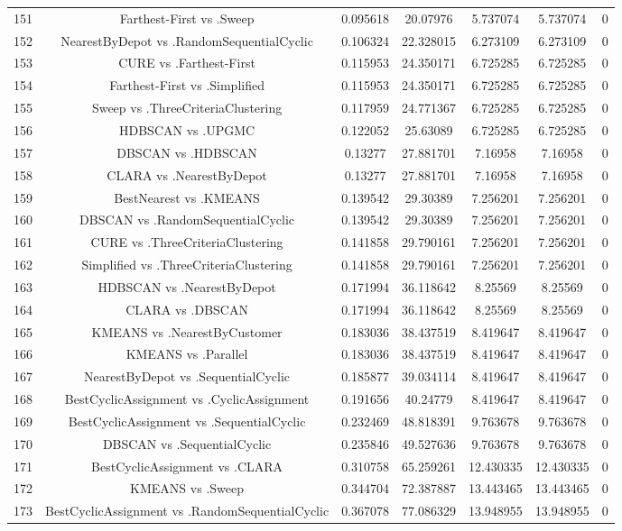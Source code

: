 \documentclass[a4paper,10pt]{article}
\begin{document}
\begin{landscape}
\begin{table}[!htp]
\begin{tabular}{ccccccc}
151&Farthest-First vs .Sweep&0.095618&20.07976&5.737074&5.737074&0\\
152&NearestByDepot vs .RandomSequentialCyclic&0.106324&22.328015&6.273109&6.273109&0\\
153&CURE vs .Farthest-First&0.115953&24.350171&6.725285&6.725285&0\\
154&Farthest-First vs .Simplified&0.115953&24.350171&6.725285&6.725285&0\\
155&Sweep vs .ThreeCriteriaClustering&0.117959&24.771367&6.725285&6.725285&0\\
156&HDBSCAN vs .UPGMC&0.122052&25.63089&6.725285&6.725285&0\\
157&DBSCAN vs .HDBSCAN&0.13277&27.881701&7.16958&7.16958&0\\
158&CLARA vs .NearestByDepot&0.13277&27.881701&7.16958&7.16958&0\\
159&BestNearest vs .KMEANS&0.139542&29.30389&7.256201&7.256201&0\\
160&DBSCAN vs .RandomSequentialCyclic&0.139542&29.30389&7.256201&7.256201&0\\
161&CURE vs .ThreeCriteriaClustering&0.141858&29.790161&7.256201&7.256201&0\\
162&Simplified vs .ThreeCriteriaClustering&0.141858&29.790161&7.256201&7.256201&0\\
163&HDBSCAN vs .NearestByDepot&0.171994&36.118642&8.25569&8.25569&0\\
164&CLARA vs .DBSCAN&0.171994&36.118642&8.25569&8.25569&0\\
165&KMEANS vs .NearestByCustomer&0.183036&38.437519&8.419647&8.419647&0\\
166&KMEANS vs .Parallel&0.183036&38.437519&8.419647&8.419647&0\\
167&NearestByDepot vs .SequentialCyclic&0.185877&39.034114&8.419647&8.419647&0\\
168&BestCyclicAssignment vs .CyclicAssignment&0.191656&40.24779&8.419647&8.419647&0\\
169&BestCyclicAssignment vs .SequentialCyclic&0.232469&48.818391&9.763678&9.763678&0\\
170&DBSCAN vs .SequentialCyclic&0.235846&49.527636&9.763678&9.763678&0\\
171&BestCyclicAssignment vs .CLARA&0.310758&65.259261&12.430335&12.430335&0\\
172&KMEANS vs .Sweep&0.344704&72.387887&13.443465&13.443465&0\\
173&BestCyclicAssignment vs .RandomSequentialCyclic&0.367078&77.086329&13.948955&13.948955&0\\

\end{tabular}
\end{table}
\end{landscape}
\end{document}
